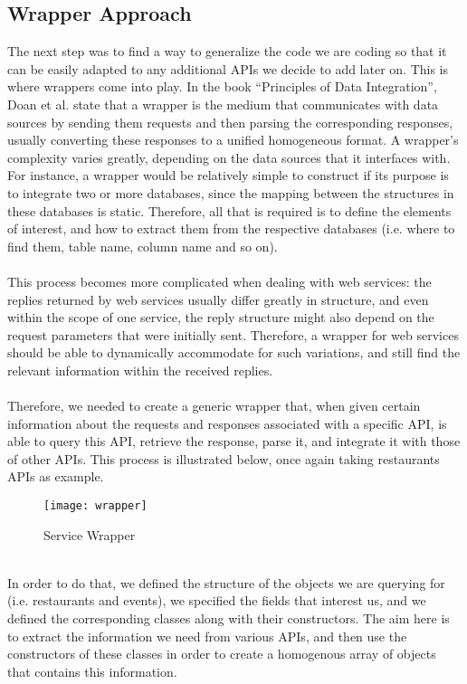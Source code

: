 \subsection{Wrapper Approach}
The next step was to find a way to generalize the code we are coding so that it can be easily adapted to any additional APIs we decide to add later on. This is where wrappers come into play. In the book ``Principles of Data Integration'', Doan et al.\cite{doan} state that a wrapper is the medium that communicates with data sources by sending them requests and then parsing the corresponding responses, usually converting these responses to a unified homogeneous format. A wrapper's complexity varies greatly, depending on the data sources that it interfaces with. For instance, a wrapper would be relatively simple to construct if its purpose is to integrate two or more databases, since the mapping between the structures in these databases is static. Therefore, all that is required is to define the elements of interest, and how to extract them from the respective databases (i.e. where to find them, table name, column name and so on).\\\\
This process becomes more complicated when dealing with web services: the replies returned by web services usually differ greatly in structure, and even within the scope of one service, the reply structure might also depend on the request parameters that were initially sent. Therefore, a wrapper for web services should be able to dynamically accommodate for such variations, and still find the relevant information within the received replies.\\\\
 Therefore, we needed to create a generic wrapper that, when given certain information about the requests and responses associated with a specific API, is able to query this API, retrieve the response, parse it, and integrate it with those of other APIs. This process is illustrated below, once again taking restaurants APIs as example.\\
\begin{figure}[h]
\centering
\texttt{[image: wrapper]}
\caption{Service Wrapper}
\end{figure}
\\
In order to do that, we defined the structure of the objects we are querying for (i.e. restaurants and events), we specified the fields that interest us, and we defined the corresponding classes along with their constructors. The aim here is to extract the information we need from various APIs, and then use the constructors of these classes in order to create a homogenous array of objects that contains this information.\\\\
